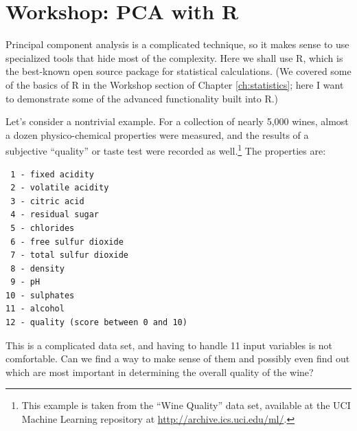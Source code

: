
% 
% 


\section{Workshop: PCA with R}

 
Principal component analysis is a complicated technique, so it makes
sense to use specialized tools that hide most of the complexity.  Here
we shall use R, which is the best-known open source package for
statistical calculations. (We covered some of the basics of R in the
Workshop section of Chapter \ref{ch:statistics}; here I want to
demonstrate some of the advanced functionality built into R.)

Let's consider a nontrivial example. For a collection of nearly 5,000
wines, almost a dozen physico-chemical properties were measured, and
the results of a subjective ``quality'' or taste test were recorded as
well.\footnote{This example is taken from the ``Wine Quality'' data
  set, available at the UCI Machine Learning repository at
  \url{http://archive.ics.uci.edu/ml/}.}  The
properties are:

\begin{verbatim}
 1 - fixed acidity 
 2 - volatile acidity 
 3 - citric acid 
 4 - residual sugar 
 5 - chlorides 
 6 - free sulfur dioxide 
 7 - total sulfur dioxide 
 8 - density 
 9 - pH 
10 - sulphates 
11 - alcohol 
12 - quality (score between 0 and 10)
\end{verbatim}

This is a complicated data set, and having to handle 11 input
variables is not comfortable. Can we find a way to make sense of them
and possibly even find out which are most important in determining the
overall quality of the wine?


